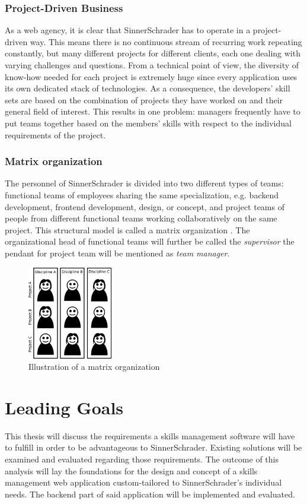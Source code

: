 \subsubsection{Project-Driven Business}
As a web agency, it is clear that SinnerSchrader has to operate in a project-driven way. This means there is no continuous stream of recurring work repeating constantly, but many different projects for different clients, each one dealing with varying challenges and questions. From a technical point of view, the diversity of know-how needed for each project is extremely huge since every application uses its own dedicated stack of technologies. As a consequence, the developers’ skill sets are based on the combination of projects they have worked on and their general field of interest. This results in one problem: managers frequently have to put teams together based on the members’ skills with respect to the individual requirements of the project.

\subsubsection{Matrix organization}
The personnel of SinnerSchrader is divided into two different types of teams: functional teams of
employees sharing the same specialization, e.g. backend development, frontend development, design, or concept, and project teams of people from different functional teams working collaboratively on the same project. This structural model is called a matrix organization \cite[P. 75]{BWL}.
The organizational head of functional teams will further be called the \textit{supervisor} the pendant for project team will be mentioned as \textit{team manager}.

\begin{figure}[!htp]
    \centering
    \includegraphics[width=0.33\textwidth]{images/matrixorga.png}
    \caption[Diagram: Matrix organization]{Illustration of a matrix organization}
    \label{fig:matrixorga}
\end{figure}



\section{Leading Goals}
This thesis will discuss the requirements a skills management software will have to fulfill in order to be advantageous to SinnerSchrader. Existing solutions will be examined and evaluated regarding those requirements. The outcome of this analysis will lay the foundations for the design and concept of a skills management web application custom-tailored to SinnerSchrader's individual needs. The backend part of said application will be implemented and evaluated.

